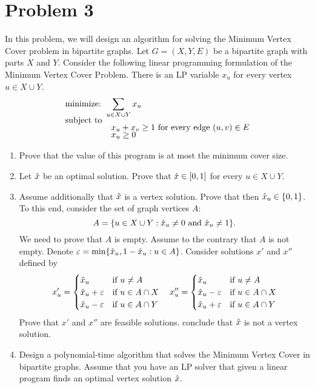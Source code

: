 \section{Problem 3}
In this problem, we will design an algorithm for solving the Minimum Vertex Cover problem in bipartite graphs. Let $G = (X, Y, E)$ be a bipartite graph with parts $X$ and $Y$. Consider the following linear programming formulation of the Minimum Vertex Cover Problem. There is an LP variable $x_u$ for every vertex $ u \in X \cup Y$.
\begin{align*}
    &\text{minimize: } \sum_{u \in X\cup Y} x_u\\[-1.5ex]
    &\text{subject to}\\[-1.5ex]
    &\hspace{19mm} x_u + x_v \geq 1 \text{ for every edge } (u, v) \in E\\[-1.5ex]
    &\hspace{19mm} x_u \geq 0
\end{align*}
\begin{enumerate}
    \item Prove that the value of this program is at most the minimum cover size.
    \item Let $\hat{x}$ be an optimal solution. Prove that $\hat{x} \in [0, 1]$ for every $u \in X\cup Y$.
    \item Assume additionally that $\hat{x}$ is a vertex solution. Prove that then $\hat{x}_u \in \{0, 1\}$. To this end, consider the set of graph vertices $A$:
    \[A = \{ u \in X \cup Y : \hat{x}_u \neq 0 \text{ and } \hat{x}_u \neq 1\}.\]
    We need to prove that $A$ is empty. Assume to the contrary that $A$ is not empty. Denote $\varepsilon = \min \{ \hat{x}_u , 1 - \hat{x}_u : u \in A\}$. Consider solutions $x'$ and $x''$ defined by
    \begin{equation*}
        x'_u = \begin{cases}
            \hat{x}_u &\text{if } u \neq A\\
            \hat{x}_u + \varepsilon &\text{if } u \in A\cap X\\
            \hat{x}_u - \varepsilon &\text{if } u \in A\cap Y\\
        \end{cases}\quad
        x''_u = \begin{cases}
            \hat{x}_u &\text{if } u \neq A\\
            \hat{x}_u - \varepsilon &\text{if } u \in A\cap X\\
            \hat{x}_u + \varepsilon &\text{if } u \in A\cap Y\\
        \end{cases}
    \end{equation*}
    Prove that $x'$ and $x''$ are feasible solutions. conclude that $\hat{x}$ is not a vertex solution. 
    \item Design a polynomial-time algorithm that solves the Minimum Vertex Cover in bipartite graphs. Assume that you have an LP solver that given a linear program finds an optimal vertex solution $\hat{x}$.
\end{enumerate}

